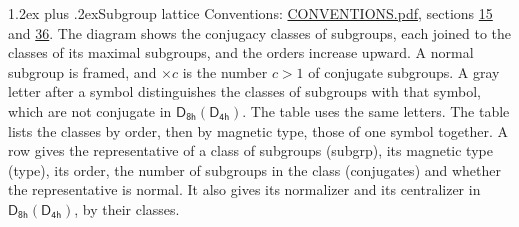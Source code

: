 \documentclass[10pt,a4paper]{article}
\makeatletter
\renewcommand\section{\@startsection{section}{1}{\z@}{-3ex plus -1ex minus -.2ex}%
  {1.2ex plus .2ex}{\normalfont\large\sffamily\bfseries\color{parttitle}}}
\numberwithin{equation}{section}
\newcommand{\grp}[1]{\mathsf{#1}}
\makeatother
\begin{document}
\section{Subgroup lattice}\label{s:subgroups}
Conventions: \href{../../CONVENTIONS.pdf}{CONVENTIONS.pdf}, sections \href{../../../rotation/CONVENTIONS.pdf\#conv.15}{15} and \href{../../CONVENTIONS.pdf\#conv.36}{36}.
The diagram shows the conjugacy classes of subgroups, each joined to the classes of its maximal subgroups, and the orders increase upward. \label{n:index.conjugates.c}\label{n:mark.conjugates}A normal subgroup is framed, and ${\times}c$ is the number $c > 1$ of conjugate subgroups. \label{n:mark.letter}A gray letter after a symbol distinguishes the classes of subgroups with that symbol, which are not conjugate in $\grp{D_{8h}}(\grp{D_{4h}})$. The table uses the same letters. The table lists the classes by order, then by magnetic type, those of one symbol together. \label{n:head.subgroup}\label{n:head.magnetic.type}\label{n:head.order}\label{n:head.conjugates}\label{n:head.normal}A row gives the representative of a class of subgroups (subgrp), its magnetic type (type), its order, the number of subgroups in the class (conjugates) and whether the representative is normal. \label{n:head.normalizer}\label{n:head.centralizer}It also gives its normalizer and its centralizer in $\grp{D_{8h}}(\grp{D_{4h}})$, by their classes. 
\end{document}
